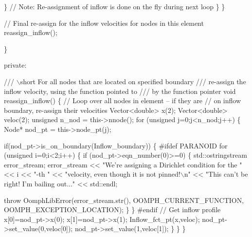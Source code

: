 \begin{DoxyCodeInclude}
        \}
       \textcolor{comment}{// Note: Re-assignment of inflow is done on the fly during next loop}
      \}
    \}
   
   \textcolor{comment}{// Final re-assign for the inflow velocities for nodes in this element}
   reassign\_inflow();
   
  \}
 
 
\textcolor{keyword}{private}:
 

\textcolor{comment}{}
\textcolor{comment}{ /// \(\backslash\)short For all nodes that are located on specified boundary}
\textcolor{comment}{ /// re-assign the inflow velocity, using the function pointed to}
\textcolor{comment}{ /// by the function pointer}
\textcolor{comment}{} \textcolor{keywordtype}{void} reassign\_inflow()
  \{ 
   \textcolor{comment}{// Loop over all nodes in element -- if they are}
   \textcolor{comment}{// on inflow boundary, re-assign their velocities}
   Vector<double> x(2);
   Vector<double> veloc(2);
   \textcolor{keywordtype}{unsigned} n\_nod = this->nnode();
   \textcolor{keywordflow}{for} (\textcolor{keywordtype}{unsigned} j=0;j<n\_nod;j++)
    \{
     Node* nod\_pt = this->node\_pt(j);

     \textcolor{keywordflow}{if}(nod\_pt->is\_on\_boundary(Inflow\_boundary))
      \{
\textcolor{preprocessor}{#ifdef PARANOID}
           \textcolor{keywordflow}{for} (\textcolor{keywordtype}{unsigned} i=0;i<2;i++)
            \{
             \textcolor{keywordflow}{if} (nod\_pt->eqn\_number(0)>=0)
              \{
               std::ostringstream error\_stream;
               error\_stream 
                << \textcolor{stringliteral}{"We're assigning a Dirichlet condition for the "} 
                << i << \textcolor{stringliteral}{"-th "}
                << \textcolor{stringliteral}{"velocity, even though it is not pinned!\(\backslash\)n"} 
                << \textcolor{stringliteral}{"This can't be right! I'm bailing out..."} 
                << std::endl;

               \textcolor{keywordflow}{throw} OomphLibError(error\_stream.str(),
                                   OOMPH\_CURRENT\_FUNCTION,
                                   OOMPH\_EXCEPTION\_LOCATION);
              \}
            \}
\textcolor{preprocessor}{#endif           }
           \textcolor{comment}{// Get inflow profile }
           x[0]=nod\_pt->x(0);
           x[1]=nod\_pt->x(1);
           Inflow\_fct\_pt(x,veloc);
           nod\_pt->set\_value(0,veloc[0]);
           nod\_pt->set\_value(1,veloc[1]);
      \}
    \}
  \}
 

\end{DoxyCodeInclude}
